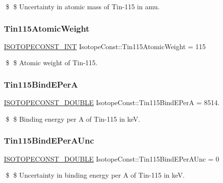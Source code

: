\$ \$ Uncertainty in atomic mass of Tin-\/115 in amu. \mbox{\label{group___isotope_const-_tin-_sn115_ga613de319313fdd30905c50dfca1e9b10}} 
\subsubsection{\texorpdfstring{Tin115\+Atomic\+Weight}{Tin115AtomicWeight}}
{\footnotesize\ttfamily \mbox{\hyperlink{group___isotope_const-_macros_ga5f18360b3e99483a35c32d789e62621c}{I\+S\+O\+T\+O\+P\+E\+C\+O\+N\+S\+T\+\_\+\+I\+NT}} Isotope\+Const\+::\+Tin115\+Atomic\+Weight = 115}

\$ \$ Atomic weight of Tin-\/115. \mbox{\label{group___isotope_const-_tin-_sn115_gacfdd68e98f9e9406206885022d818bfa}} 
\subsubsection{\texorpdfstring{Tin115\+Bind\+E\+PerA}{Tin115BindEPerA}}
{\footnotesize\ttfamily \mbox{\hyperlink{group___isotope_const-_macros_ga8f45a7272ce02c0b4c65c44636ed719a}{I\+S\+O\+T\+O\+P\+E\+C\+O\+N\+S\+T\+\_\+\+D\+O\+U\+B\+LE}} Isotope\+Const\+::\+Tin115\+Bind\+E\+PerA = 8514.}

\$ \$ Binding energy per A of Tin-\/115 in keV. \mbox{\label{group___isotope_const-_tin-_sn115_ga9dbe8d6716424cd8e1ae330cb2850261}} 
\subsubsection{\texorpdfstring{Tin115\+Bind\+E\+Per\+A\+Unc}{Tin115BindEPerAUnc}}
{\footnotesize\ttfamily \mbox{\hyperlink{group___isotope_const-_macros_ga8f45a7272ce02c0b4c65c44636ed719a}{I\+S\+O\+T\+O\+P\+E\+C\+O\+N\+S\+T\+\_\+\+D\+O\+U\+B\+LE}} Isotope\+Const\+::\+Tin115\+Bind\+E\+Per\+A\+Unc = 0}

\$ \$ Uncertainty in binding energy per A of Tin-\/115 in keV. \mbox{\label{group___isotope_const-_tin-_sn115_ga206ec61bdd55636773acbd8f623bc76c}} 
